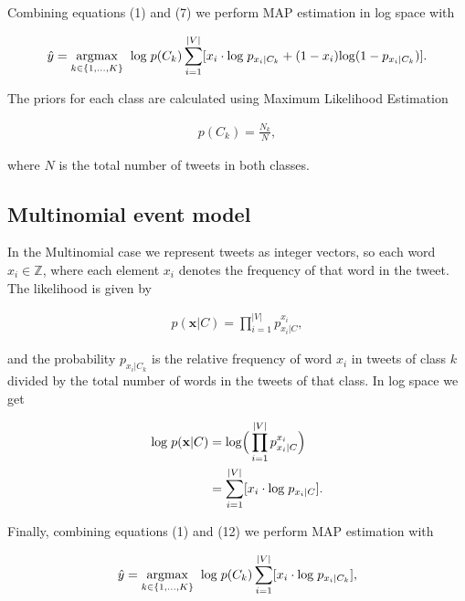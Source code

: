 \documentclass{article}
\renewcommand{\vec}[1]{\mathbf{#1}}
\begin{document}
\noindent
Combining equations (1) and (7) we perform MAP estimation in log space with

\begin{align}
\hat{y} = \underset{k \in \{1,\dots,K\}}{\rm{argmax}} \hspace{2mm} \mathrm{log}\hspace{1mm} p(C_k)\sum_{i=1}^{|V|} \lbrack x_i \cdot \mathrm{log} \hspace{1mm} p_{x_i|C_k} + (1-x_i)\mathrm{log}(1-p_{x_i|C_k}) \rbrack.
\end{align}

\noindent
The priors for each class are calculated using Maximum Likelihood Estimation

\begin{align}
p(C_k) = \frac{N_k}{N},
\end{align}

\noindent
where $N$ is the total number of tweets in both classes.

\subsection{Multinomial event model}

In the Multinomial case we represent tweets as integer vectors, so each word $x_i \in \mathbb{Z}$, where each element $x_i$ denotes the frequency of that word in the tweet. The likelihood is given by

\begin{align}
p(\vec{x}|C) = \prod^{|V|}_{i=1} p_{x_i|C}^{x_i},
\end{align}

\noindent
and the probability $p_{x_i|C_k}$ is the relative frequency of word $x_i$ in tweets of class $k$ divided by the total number of words in the tweets of that class. In log space we get


\begin{align}
\mathrm{log} \hspace{1mm} p(\vec{x}|C) &= \mathrm{log}\Big(\prod^{|V|}_{i=1} p_{x_i|C}^{x_i}\Big) \\
                     &= \sum_{i=1}^{|V|} \lbrack x_i \cdot \mathrm{log} \hspace{1mm} p_{x_i|C} \rbrack.
\end{align}

\noindent
Finally, combining equations (1) and (12) we perform MAP estimation with

\begin{align}
\hat{y} = \underset{k \in \{1,\dots,K\}}{\rm{argmax}} \hspace{2mm} \mathrm{log}\hspace{1mm} p(C_k)\sum_{i=1}^{|V|} \lbrack x_i \cdot \mathrm{log} \hspace{1mm} p_{x_i|C_k} \rbrack,
\end{align}
\end{document}
